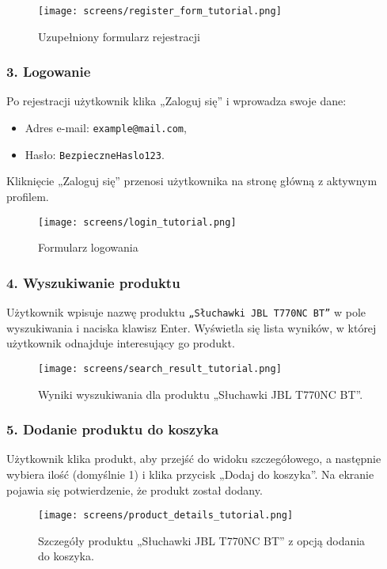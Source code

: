 \documentclass[12pt,a4paper,oneside]{article}
\theoremstyle{definition}
\numberwithin{equation}{section}
\begin{document}
\begin{figure}[H]
    \centering
    \texttt{[image: screens/register\_form\_tutorial.png]}
    \caption{Uzupełniony formularz rejestracji}
    \label{fig:register_form_tutorial}
\end{figure}

\subsubsection*{\textbf{3. Logowanie}}
Po rejestracji użytkownik klika „Zaloguj się” i wprowadza swoje dane:
\begin{itemize}
    \item Adres e-mail: \texttt{example@mail.com},
    \item Hasło: \texttt{BezpieczneHaslo123}.
\end{itemize}
Kliknięcie „Zaloguj się” przenosi użytkownika na stronę główną z aktywnym profilem.

\begin{figure}[H]
    \centering
    \texttt{[image: screens/login\_tutorial.png]}
    \caption{Formularz logowania}
    \label{fig:login_tutorial}
\end{figure}

\subsubsection*{\textbf{4. Wyszukiwanie produktu}}
Użytkownik wpisuje nazwę produktu \texttt{„Słuchawki JBL T770NC BT”} w pole wyszukiwania i naciska klawisz Enter. Wyświetla się lista wyników, w której użytkownik odnajduje interesujący go produkt.

\begin{figure}[H]
    \centering
    \texttt{[image: screens/search\_result\_tutorial.png]}
    \caption{Wyniki wyszukiwania dla produktu „Słuchawki JBL T770NC BT”.}
    \label{fig:search_results_tutorial}
\end{figure}

\subsubsection*{\textbf{5. Dodanie produktu do koszyka}}
Użytkownik klika produkt, aby przejść do widoku szczegółowego, a następnie wybiera ilość (domyślnie 1) i klika przycisk „Dodaj do koszyka”. Na ekranie pojawia się potwierdzenie, że produkt został dodany.

\begin{figure}[H]
    \centering
    \texttt{[image: screens/product\_details\_tutorial.png]}
    \caption{Szczegóły produktu „Słuchawki JBL T770NC BT” z opcją dodania do koszyka.}
    \label{fig:product_details_tutorial}
\end{figure}
\end{document}
